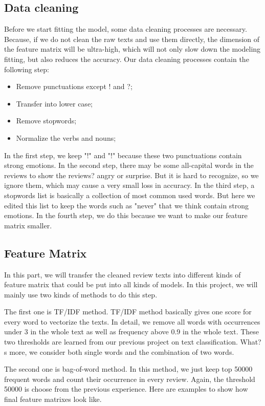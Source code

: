 \documentclass[letterpaper]{article} %
\begin{document}
\subsection{Data cleaning}
Before we start fitting the model, some data cleaning processes are necessary. Because, if we do not clean the raw texts and use them directly, the dimension of the feature matrix will be ultra-high, which will not only slow down the modeling fitting, but also reduces the accuracy. 
Our data cleaning processes contain the following step:
\begin{itemize}
\item Remove punctuations except ! and ?;
\item Transfer into lower case;
\item Remove stopwords;
\item Normalize the verbs and nouns;
\end{itemize}
In the first step, we keep "!" and "!" because these two punctuations contain strong emotions. In the second step, there may be some all-capital words in the reviews to show the reviews? angry or surprise. But it is hard to recognize, so we ignore them, which may cause a very small loss in accuracy. In the third step, a stopwords list is basically a collection of most common used words. But here we edited this list to keep the words such as "never" that we think contain strong emotions. In the fourth step, we do this because we want to make our feature matrix smaller.
\subsection{Feature Matrix}
In this part, we will transfer the cleaned review texts into different kinds of feature matrix that could be put into all kinds of models. In this project, we will mainly use two kinds of methods to do this step. \par
The first one is TF/IDF method. TF/IDF method basically gives one score for every word to vectorize the texts. In detail, we remove all words with occurrences under 3 in the whole text as well as frequency above 0.9 in the whole text. These two thresholds are learned from our previous project on text classification. What?s more, we consider both single words and the combination of two words.\par
The second one is bag-of-word method. In this method, we just keep top 50000 frequent words and count their occurrence in every review. Again, the threshold 50000 is choose from the previous experience. Here are examples to show how final feature matrixes look like.
\end{document}
